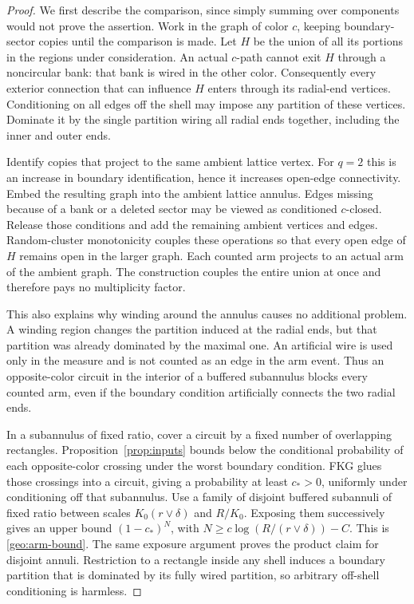 \begin{proof}
We first describe the comparison, since simply summing over components
would not prove the assertion. Work in the graph of color \(c\), keeping
boundary-sector copies until the comparison is made. Let \(H\) be the
union of all its portions in the regions under consideration. An
actual \(c\)-path cannot exit \(H\) through a noncircular bank: that bank
is wired in the other color. Consequently every exterior connection
that can influence \(H\) enters through its radial-end vertices.
Conditioning on all edges off the shell may impose any partition of
these vertices. Dominate it by the single partition wiring all radial
ends together, including the inner and outer ends.

Identify copies that project to the same ambient lattice vertex.
For \(q=2\) this is an increase in boundary identification, hence it
increases open-edge connectivity. Embed the resulting graph into the
ambient lattice annulus. Edges missing because of a bank or a deleted
sector may be viewed as conditioned \(c\)-closed. Release those
conditions and add the remaining ambient vertices and edges.
Random-cluster monotonicity couples these operations so that every
open edge of \(H\) remains open in the larger graph. Each counted arm
projects to an actual arm of the ambient graph. The construction
couples the entire union at once and therefore pays no multiplicity
factor.

This also explains why winding around the annulus causes no additional
problem. A winding region changes the partition induced at the radial
ends, but that partition was already dominated by the maximal one.
An artificial wire is used only in the measure and is not counted as
an edge in the arm event. Thus an opposite-color circuit in the
interior of a buffered subannulus blocks every counted arm, even if
the boundary condition artificially connects the two radial ends.

In a subannulus of fixed ratio, cover a circuit by a fixed number of
overlapping rectangles. Proposition~\ref{prop:inputs} bounds below
the conditional probability of each opposite-color crossing under
the worst boundary condition. FKG glues those crossings into a
circuit, giving a probability at least \(c_*>0\), uniformly under
conditioning off that subannulus. Use a family of disjoint buffered
subannuli of fixed ratio between scales \(K_0(r\vee\delta)\) and
\(R/K_0\). Exposing them successively gives an upper bound
\((1-c_*)^N\), with
\(N\ge c\log(R/(r\vee\delta))-C\). This is
\eqref{geo:arm-bound}. The same exposure argument proves the product
claim for disjoint annuli. Restriction to a rectangle inside any
shell induces a boundary partition that is dominated by its fully
wired partition, so arbitrary off-shell conditioning is harmless.
\end{proof}

